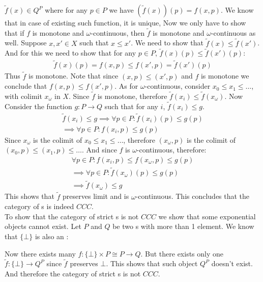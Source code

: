         $\tilde{f}(x) \in Q^P$ where for any $p \in P$ we have $(\tilde{f}(x))(p) = f(x, p)$. We know that in case of existing such function, it is unique, Now we only have to show that if $f$ is monotone and $\omega$-continuous, then $\tilde{f}$ is monotone and $\omega$-continuous as well.
        Suppose $x, x' \in X$ such that $x \le x'$. We need to show that $\tilde{f}(x) \le \tilde{f}(x')$. And for this we need to show that for any $p \in P$, $\tilde{f}(x)(p) \le \tilde{f}(x')(p)$:
        \begin{gather*}
            \tilde{f}(x)(p) = f(x, p) \le f(x', p) = \tilde{f}(x')(p)
        \end{gather*}
        Thus $\tilde{f}$ is monotone. Note that since $(x, p) \le (x', p)$ and $f$ is monotone we conclude that $f(x, p) \le f(x', p)$. As for $\omega$-continuous, consider $x_0 \le x_1 \le \dots$, with colimit $x_\omega$ in $X$. Since $\tilde{f}$ is monotone, therefore $\tilde{f}(x_i) \le \tilde{f}(x_\omega)$. Now Consider the function $g: P \to Q$ such that for any $i$, $\tilde{f}(x_i) \le g$.
        \begin{gather*}
            \tilde{f}(x_i) \le g \implies \forall p \in P: \tilde{f}(x_i)(p) \le g(p) \\
            \implies \forall p \in P: f(x_i, p) \le g(p)
        \end{gather*}
        Since $x_\omega$ is the colimit of $x_0 \le x_1 \le \dots$, therefore $(x_\omega, p)$ is the colimit of $(x_0, p) \le (x_1, p) \le \dots$. And since $f$ is $\omega$-continuous, therefore:
        \begin{gather*}
            \forall p \in P: f(x_i, p) \le f(x_\omega, p) \le g(p) \\
            \implies \forall p \in P: \tilde{f}(x_\omega)(p) \le g(p) \\
            \implies \tilde{f}(x_\omega) \le g
        \end{gather*}
        This shows that $\tilde{f}$ preserves limit and is $\omega$-continuous. 
        This concludes that the category of \wcpo s is indeed $CCC$. \\
        To show that the category of strict \wcpo s is not $CCC$ we show that some exponential objects cannot exist. Let $P$ and $Q$ be two \wcpo s with more than 1 element. We know that $\{\bot\}$ is also an \wcpo :
        \begin{center}
        \end{center}
        Now there exists many $f: \{\bot\} \times P \cong P \to Q$. But there exists only one $\tilde{f}: \{\bot\} \to Q^P$ since $\tilde{f}$ preserves $\bot$. This shows that such object $Q^P$ doesn't exist. And therefore the category of strict \wcpo s is not $CCC$.